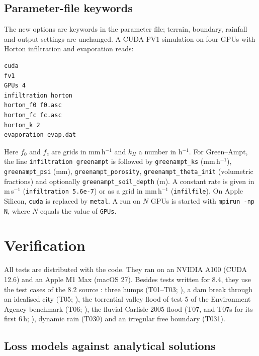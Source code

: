 \documentclass[preprint,12pt,authoryear]{elsarticle}
\begin{document}
\subsection{Parameter-file keywords}\label{sec:usage}

The new options are keywords in the parameter file; terrain, boundary,
rainfall and output settings are unchanged. A CUDA FV1 simulation on four
GPUs with Horton infiltration and evaporation reads:
\begin{verbatim}
cuda
fv1
GPUs 4
infiltration horton
horton_f0 f0.asc
horton_fc fc.asc
horton_k 2
evaporation evap.dat
\end{verbatim}
Here $f_0$ and $f_c$ are grids in mm\,h$^{-1}$ and $k_H$ a number in
h$^{-1}$. For Green--Ampt, the line \texttt{infiltration greenampt} is
followed by \texttt{greenampt\_ks} (mm\,h$^{-1}$), \texttt{greenampt\_psi}
(mm), \texttt{greenampt\_porosity}, \texttt{greenampt\_theta\_init}
(volumetric fractions) and optionally \texttt{greenampt\_soil\_depth} (m).
A constant rate is given in m\,s$^{-1}$ (\texttt{infiltration 5.6e-7}) or as a
grid in mm\,h$^{-1}$ (\texttt{infilfile}). On Apple Silicon, \texttt{cuda} is
replaced by \texttt{metal}. A run on $N$ GPUs is started with
\texttt{mpirun -np N}, where $N$ equals the value of \texttt{GPUs}.

\section{Verification}\label{sec:verification}

All tests are distributed with the code. They ran on an NVIDIA A100 (CUDA
12.6) and an Apple M1 Max (macOS 27). Besides tests written for 8.4, they use
the test cases of the 8.2 source \citep{LISFLOODFP82zenodo}: three humps
(T01--T03; \citealp{Liang2009,Shirvani2021}), a dam break through an
idealised city (T05; \citealp{SoaresFrazao2008}), the torrential valley flood
of test 5 of the Environment Agency benchmark (T06;
\citealp{NeelzPender2013,Ayog2021}), the fluvial Carlisle 2005 flood (T07, and
T07s for its first 6\,h; \citealp{Horritt2010,Neal2013}),
dynamic rain (T030) and an irregular free boundary (T031).

\subsection{Loss models against analytical solutions}\label{sec:losstests}
\end{document}
